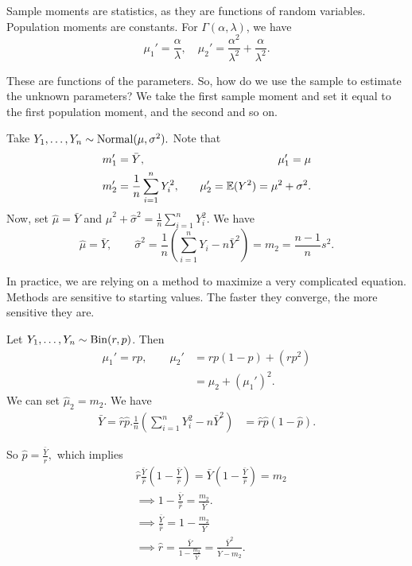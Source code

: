 Sample moments are statistics, as they are functions of random variables. Population moments are constants. For $\Gamma(\alpha,\lambda)$, we have
$$
		\mu_1'=\frac{\alpha}{\lambda}, \quad \mu_2'=\frac{\alpha^2}{\lambda^2}+\frac{\alpha}{\lambda^2}.
$$

These are functions of the parameters. So, how do we use the sample to estimate the unknown parameters? We take the first sample moment and set it equal to the first population moment, and the second and so on. 

\begin{eg}
Take $Y_1,\dots,Y_n\sim \operatorname*{Normal}(\mu,\sigma^2).$ Note that
\begin{align*}
  &m_1'=\bar Y, \quad &\mu_1'=\mu\\
  &m_2'=\frac{1}{n}\sum^n_{i=1}Y_i^2, \quad &\mu_2'=\mathbb E(Y^2)=\mu^2+\sigma^2.
\end{align*}
Now, set $\hat \mu=\bar Y$ and $\hat \mu^2+\hat \sigma^2=\frac{1}{n}\sum^n_{i=1}Y_i^2$. We have
$$
\hat \mu = \bar Y, \quad \quad \hat \sigma^2=\frac{1}{n}\left(\sum^n_{i=1}Y_i-n\bar Y^2\right)=m_2=\frac{n-1}{n}s^2.
$$
\end{eg}

In practice, we are relying on a method to maximize a very complicated equation. Methods are sensitive to starting values. The faster they converge, the more sensitive they are.

\begin{eg}
Let $Y_1,\dots,Y_n\sim \operatorname*{Bin}(r,p)$. Then
\begin{align*}
    \mu_1'=rp, \quad \quad \mu_2'&=rp(1-p)+(rp^2) \\
    &=\mu_2+(\mu_1')^2.
    \end{align*}
We can set $\hat \mu_2=m_2.$ We have
\begin{align*}
	\bar Y=\hat r \hat p.
    \frac{1}{n}\left(\sum^n_{i=1}Y_i^2-n\bar Y^2\right)&=\hat r\hat p(1-\hat p).
\end{align*}

So $\hat p=\frac{\bar Y}{\hat r},$ which implies
\begin{align*}
    &\hat r\frac{\bar Y}{\hat r}\left(1-\frac{\bar Y}{\hat r}\right)=\bar{Y}\left( 1-\frac{\bar{Y}}{\hat{r}} \right) =m_2 \\
    &\implies 1-\frac{\bar Y}{\hat r}=\frac{m_2}{\bar Y}. \\
    &\implies \frac{\bar Y}{\hat r}= 1-\frac{m_2}{\bar Y} \\
    &\implies \hat r=\frac{\bar Y}{1-\frac{m_2}{\bar Y}}=\frac{\bar Y^2}{\bar Y-m_2}.
\end{align*}
\end{eg}


